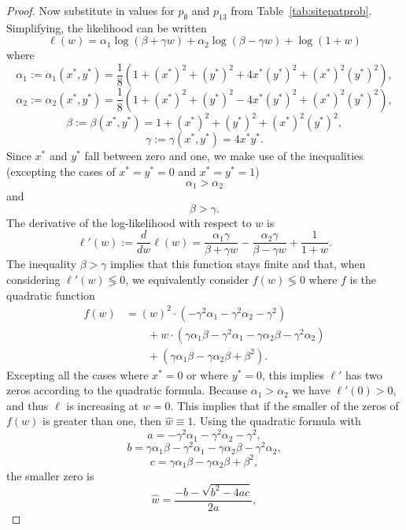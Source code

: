 \begin{proof}
Now substitute in values for $p_{\emptyset}$ and $p_{13}$ from Table~\ref{tab:sitepatprob}.
Simplifying, the likelihood can be written
$$
\ell(w) = \alpha_1\log(\beta+\gamma w) + \alpha_2\log(\beta-\gamma w) + \log(1+w)
$$
where
$$
\alpha_1 := \alpha_1(x^*, y^*) = \frac{1}{8} \left(1+(x^*)^2+(y^*)^2+4x^*(y^*)^2+(x^*)^2(y^*)^2\right),
$$
$$
\alpha_2 := \alpha_2(x^*, y^*) = \frac{1}{8}\left(1+(x^*)^2+(y^*)^2-4x^*(y^*)^2+(x^*)^2(y^*)^2\right),
$$
$$
\beta := \beta(x^*, y^*) = 1+(x^*)^2+(y^*)^2+(x^*)^2(y^*)^2,
$$
$$
\gamma := \gamma(x^*, y^*) = 4x^*y^*.
$$
Since $x^*$ and $y^*$ fall between zero and one, we make use of the inequalities (excepting the cases of $x^*=y^*=0$ and $x^*=y^*=1$)
$$
\alpha_1 > \alpha_2
$$
and
$$
\beta > \gamma.
$$
The derivative of the log-likelihood with respect to $w$ is
$$
\ell'(w) := \frac{d}{dw} \ell(w) = \frac{\alpha_1 \gamma}{\beta+\gamma w} - \frac{\alpha_2 \gamma}{\beta-\gamma w} + \frac{1}{1+w}.
$$
The inequality $\beta > \gamma$ implies that this function stays finite and that, when considering $\ell'(w) \lessgtr 0$, we equivalently consider $f(w) \lessgtr 0$ where $f$ is the quadratic function
\begin{align*}
f(w) &= (w)^2\cdot(-\gamma^2\alpha_1-\gamma^2\alpha_2-\gamma^2) \\
      &\qquad + w\cdot(\gamma\alpha_1\beta-\gamma^2\alpha_1-\gamma\alpha_2\beta-\gamma^2\alpha_2) \\
      &\qquad + (\gamma\alpha_1\beta-\gamma\alpha_2\beta+\beta^2).
\end{align*}
Excepting all the cases where $x^*=0$ or where $y^*=0$, this implies $\ell'$ has two zeros according to the quadratic formula.
Because $\alpha_1 > \alpha_2$ we have $\ell'(0) > 0$, and thus $\ell$ is increasing at $w=0$.
This implies that if the smaller of the zeros of $f(w)$ is greater than one, then $\hat{w} \equiv 1$.
Using the quadratic formula with
$$
a = -\gamma^2 \alpha_1 - \gamma^2 \alpha_2 - \gamma^2,
$$
$$
b = \gamma \alpha_1 \beta - \gamma^2\alpha_1 - \gamma \alpha_2 \beta - \gamma^2 \alpha_2,
$$
$$
c = \gamma \alpha_1 \beta - \gamma \alpha_2 \beta + \beta^2,
$$
the smaller zero is
$$
\hat{w} = \frac{-b - \sqrt{b^2 - 4ac}}{2a},
$$
\end{proof}
